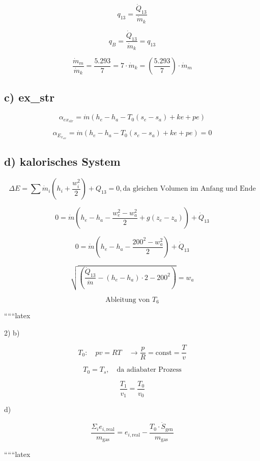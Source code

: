 \begin{equation}
q_{13} = \frac{\dot{Q}_{13}}{\dot{m}_k}
\end{equation}

\begin{equation}
q_{B} = \frac{\dot{Q}_{13}}{\dot{m}_k} = q_{13}
\end{equation}

\begin{equation}
\frac{\dot{m}_m}{\dot{m}_k} = \frac{5.293}{7} = 7 \cdot \dot{m}_k = \left( \frac{5.293}{7} \right) \cdot \dot{m}_m
\end{equation}

\subsection*{c) ex_{str}}

\begin{equation}
\alpha_{ex_{str}} = \dot{m} (h_e - h_a - T_0 (s_e - s_a) + ke + pe)
\end{equation}

\begin{equation}
\alpha_{E_{x_{str}}} = \dot{m} (h_e - h_a - T_0 (s_e - s_a) + ke + pe) = 0
\end{equation}

\subsection*{d) kalorisches System}

\begin{equation}
\Delta E = \sum \dot{m}_i \left( h_i + \frac{w_i^2}{2} \right) + Q_{13} = 0, \text{da gleichen Volumen im Anfang und Ende}
\end{equation}

\begin{equation}
0 = \dot{m} (h_e - h_a - \frac{w_e^2 - w_a^2}{2} + g(z_e - z_a)) + \dot{Q}_{13}
\end{equation}

\begin{equation}
0 = \dot{m} (h_e - h_a - \frac{200^2 - w_a^2}{2}) + \dot{Q}_{13}
\end{equation}

\begin{equation}
\sqrt{\left( \frac{\dot{Q}_{13}}{\dot{m}} - (h_e - h_a) \cdot 2 - 200^2 \right)} = w_a
\end{equation}

\begin{equation}
\text{Ableitung von } T_6
\end{equation}

``````latex


2) b)

\[
T_0 : \quad p v = R T \quad \rightarrow \frac{p}{R} = \text{const} = \frac{T}{v}
\]

\[
T_0 = T_s, \quad \text{da adiabater Prozess}
\]

\[
\frac{T_1}{v_1} = \frac{T_0}{v_0}
\]

d)

\[
\frac{\Sigma_i e_{i, \text{real}}}{m_{\text{gas}}} = e_{i, \text{real}} - \frac{T_0 \cdot \dot{S}_{\text{gen}}}{m_{\text{gas}}}
\]

``````latex



